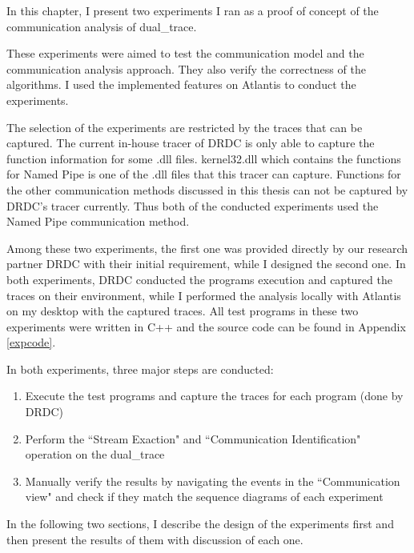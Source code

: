 


\label{chapter:Exp}
In this chapter, I present two experiments I ran as a proof of concept of the communication analysis of dual\_trace.

These experiments were aimed to test the communication model and the communication analysis approach. They also verify the correctness of the algorithms. I used the implemented features on Atlantis to conduct the experiments.

The selection of the experiments are restricted by the traces that can be captured. The current in-house tracer of DRDC is only able to capture the function information for some .dll files. kernel32.dll which contains the functions for Named Pipe is one of the .dll files that this tracer can capture. Functions for the other communication methods discussed in this thesis can not be captured by DRDC's tracer currently.  Thus both of the conducted experiments used the Named Pipe communication method. 

Among these two experiments, the first one was provided directly by our research partner DRDC with their initial requirement, while I designed the second one. In both experiments, DRDC conducted the programs execution and captured the traces on their environment, while I performed the analysis locally with Atlantis on my desktop with the captured traces. All test programs in these two experiments were written in C++ and the source code can be found in Appendix \ref{expcode}. 

In both experiments, three major steps are conducted:
\begin{enumerate}
\item Execute the test programs and capture the traces for each program (done by DRDC)

\item Perform the ``Stream Exaction" and ``Communication Identification" operation on the dual\_trace

\item Manually verify the results by navigating the events in the ``Communication view" and check if they match the sequence diagrams of each experiment
\end{enumerate}

In the following two sections, I describe the design of the experiments first and then present the results of them with discussion of each one.

